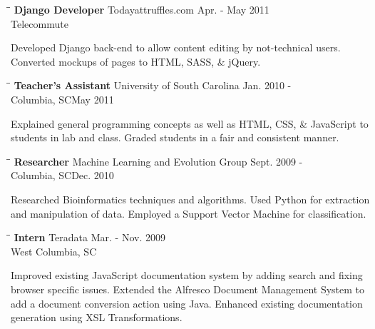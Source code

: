 \documentclass{res}
\begin{document}
\begin{resume}
    \begin{tabbing}%
   \hspace{2.3in}\= \hspace{2.6in}\= \kill %
   {\bf Django Developer}  \>Todayattruffles.com \> Apr. - May 2011\\
                          \>Telecommute
   \end{tabbing}\vspace{-20pt}
   Developed Django back-end to allow content editing by not-technical users.  Converted 
   mockups of pages to HTML, SASS, \& jQuery.
   
   \begin{tabbing}%
   \hspace{2.3in}\= \hspace{2.6in}\= \kill %
   {\bf Teacher's Assistant}  \>University of South Carolina \> Jan. 2010 - \\
                          \>Columbia, SC\>May 2011
   \end{tabbing}\vspace{-20pt}
   Explained general programming concepts as well as HTML, CSS, \& JavaScript to students in
   lab and class.  Graded students in a fair and consistent manner. 
   
   \begin{tabbing}%
   \hspace{2.3in}\= \hspace{2.6in}\= \kill %
   {\bf Researcher}  \>Machine Learning and Evolution Group \> Sept. 2009 - \\
                          \>Columbia, SC\>Dec. 2010
   \end{tabbing}\vspace{-20pt}
   Researched Bioinformatics techniques and algorithms.  Used Python for extraction and 
   manipulation of data.  Employed a Support Vector Machine for classification.
   
   \begin{tabbing}%
   \hspace{2.3in}\= \hspace{2.6in}\= \kill %
   {\bf Intern}  \>Teradata \> Mar. - Nov. 2009\\
                          \>West Columbia, SC
   \end{tabbing}\vspace{-20pt}
   Improved existing JavaScript documentation system by adding search and fixing browser specific
   issues.  Extended the Alfresco Document Management System to add a document conversion 
   action using Java.  Enhanced existing documentation generation using XSL Transformations.


\end{resume}
\end{document}

